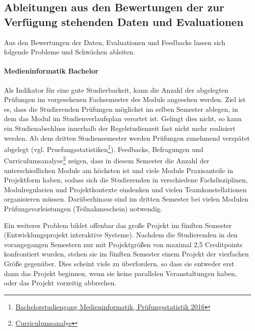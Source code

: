 \subsection{Ableitungen aus den Bewertungen der zur Verfügung
stehenden Daten und
Evaluationen}\label{ableitungen-aus-den-bewertungen-der-zur-verfuxfcgung-stehenden-daten-und-evaluationen}

Aus den Bewertungen der Daten, Evaluationen und Feedbacks lassen sich
folgende Probleme und Schwächen ableiten.

\paragraph{Medieninformatik Bachelor}\label{medieninformatik-bachelor}

Als Indikator für eine gute Studierbarkeit, kann die Anzahl der
abgelegten Prüfungen im vorgesehenen Fachsemester des Moduls angesehen
werden. Ziel ist es, dass die Studierenden Prüfungen möglichst im selben
Semester ablegen, in dem das Modul im Studienverlaufsplan verortet ist.
Gelingt dies nicht, so kann ein Studienabschluss innerhalb der
Regelstudienzeit fast nicht mehr realisiert werden. Ab dem dritten
Studiensemester werden Prüfungen zunehmend verspätet abgelegt (vgl.
Pruefungsstatistiken\footnote{\href{https://th-koeln.github.io/mi-2017/anhaenge/ba-pruefungsstatistiken.pdf}{Bachelorstudiengang
  Medieninformatik, Prüfungsstatistik 2016}}). Feedbacks, Befragungen
und Curriculumsanalyse\footnote{\href{https://th-koeln.github.io/mi-2017/anhaenge/ba-pruefungsstatistiken.pdf}{Curriculumsanalye}}
zeigen, dass in diesem Semester die Anzahl der unterschiedlichen Module
am höchsten ist und viele Module Praxisanteile in Projektform haben,
sodass sich die Studierenden in verschiedene Fachdisziplinen,
Modulregularien und Projektkontexte eindenken und vielen
Teamkonstellationen organisieren müssen. Darüberhinaus sind im dritten
Semester bei vielen Modulen Prüfungsvorleistungen (Teilnahmeschein)
notwendig.

Ein weiteres Problem bildet offenbar das große Projekt im fünften
Semester (Entwicklungsprojekt interaktive Systeme). Nachdem die
Studierenden in den vorangegangen Semestern nur mit Projektgrößen von
maximal 2,5 Creditpoints konfrontiert wurden, stehen sie im fünften
Semester einem Projekt der vierfachen Größe gegenüber. Dies scheint
viele zu überfordern, so dass sie entweder erst dann das Projekt
beginnen, wenn sie keine parallelen Veranstaltungen haben, oder das
Projekt vorzeitig abbrechen.

